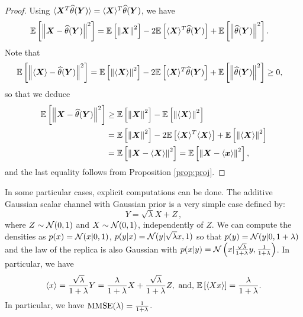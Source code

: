 \documentclass[12pt,nocut]{article}
\begin{document}
\begin{proof}
Using $\langle {\boldsymbol X}^T\widehat{\theta}({\boldsymbol Y})\rangle  = \langle {\boldsymbol X}\rangle^T \widehat{\theta}({\boldsymbol Y})$, we have
\begin{align*}
\mathbb{E} \left[ \left\| {\boldsymbol X} -  \widehat{\theta}({\boldsymbol Y})\right\|^2 \right] & = \mathbb{E}\left[ \left\| {\boldsymbol X}\right\|^2\right] - 2 \mathbb{E} \left[ \langle {\boldsymbol X}\rangle^T \widehat{\theta}({\boldsymbol Y})\right] + \mathbb{E}\left[ \left\| \widehat{\theta}({\boldsymbol Y})\right\|^2\right].
\end{align*}
Note that
\begin{align*}
\mathbb{E} \left[ \left\|\langle {\boldsymbol X}\rangle -  \widehat{\theta}({\boldsymbol Y})\right\|^2 \right] & = \mathbb{E}\left[ \left\| \langle {\boldsymbol X}\rangle\right\|^2\right] - 2 \mathbb{E} \left[ \langle {\boldsymbol X}\rangle^T \widehat{\theta}({\boldsymbol Y})\right] + \mathbb{E}\left[ \left\| \widehat{\theta}({\boldsymbol Y})\right\|^2\right]\geq 0,
\end{align*}
so that we deduce
\begin{align*}
\mathbb{E} \left[ \left\| {\boldsymbol X} -  \widehat{\theta}({\boldsymbol Y})\right\|^2 \right] & \geq \mathbb{E}\left[ \left\| {\boldsymbol X}\right\|^2\right] - \mathbb{E}\left[ \left\| \langle {\boldsymbol X}\rangle\right\|^2\right]\\
& = \mathbb{E}\left[ \left\| {\boldsymbol X}\right\|^2\right] -2\mathbb{E} \left[ \langle {\boldsymbol X}\rangle^T\langle {\boldsymbol X}\rangle \right] + \mathbb{E}\left[ \left\| \langle {\boldsymbol X}\rangle\right\|^2\right]\\
& = \mathbb{E} \left[ \left\| {\boldsymbol X} - \langle {\boldsymbol X}\rangle \right\|^2 \right]= \mathbb{E} \left[ \left\| {\boldsymbol X} - \langle {\boldsymbol x} \rangle \right\|^2 \right],
\end{align*}
and the last equality follows from Proposition \ref{prop:proj}.
\end{proof}

\begin{example}
In some particular cases, explicit computations can be done. The additive Gaussian scalar channel with Gaussian prior is a very simple case defined by:
\begin{equation}\label{eq:additive_scalar_channel}
	Y = \sqrt{\lambda} X + Z \,,
\end{equation}
where $Z \sim \mathcal{N}(0,1)$ and $X\sim\mathcal{N}(0,1)$, independently of $Z$. We can compute the densities as $p(x) = \mathcal{N}(x|0,1)$, $p(y|x) = \mathcal{N}(y|\sqrt{\lambda} x,1)$ so that $p(y) = \mathcal{N}(y|0, 1+\lambda)$ and the law of the replica is also Gaussian with $p(x|y) =\mathcal{N}\left(x|\frac{\sqrt{\lambda}}{1+\lambda}y,\frac{1}{1+\lambda}\right)$. In particular, we have
$$
\langle x \rangle = \frac{\sqrt{\lambda}}{1+\lambda}Y = \frac{\lambda}{1+\lambda}X+\frac{\sqrt{\lambda}}{1+\lambda}Z, \text{ and, }  \mathbb{E} \left[\langle X  x \rangle \right] = \frac{\lambda}{1+\lambda}.
$$
In particular, we have ${{\rm MMSE}}(\lambda) = \frac{1}{1+\lambda}$.
\end{example}
\end{document}
